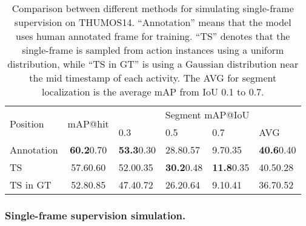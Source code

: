 \documentclass[runningheads]{llncs}
\begin{document}
	\begin{table}[!t]
		\centering
		\small
		\caption{Comparison between different methods for simulating single-frame supervision on THUMOS14. ``Annotation'' means that the model uses human annotated frame for training. 
			``TS'' denotes that the single-frame is sampled from action instances using a uniform distribution, while ``TS in GT'' is using a Gaussian distribution near the mid timestamp of each activity. The AVG for segment localization is the average mAP from IoU 0.1 to 0.7. 
		}
		
		\setlength\extrarowheight{1pt}
\begin{tabular}{l|c|p{1.7cm}p{1.7cm}p{1.7cm}p{1.7cm}}
			\hline
			\multirow{2}{*}{Position} &  \multirow{2}{*}{mAP@hit} & \multicolumn{4}{c}{Segment mAP@IoU }          \\ \cline{3-6}
			\multicolumn{1}{c|}{}  & &  0.3  & 0.5  & 0.7  & AVG    \\ \hline
			Annotation  & \textbf{60.2}0.70  & \textbf{53.3}0.30 & 28.80.57 & 9.70.35 & \textbf{40.6}0.40\\
			TS & 57.60.60 & 52.00.35 & \textbf{30.2}0.48 & \textbf{11.8}0.35 & 40.50.28 \\
			TS in GT & 52.80.85	& 47.40.72	& 26.20.64	& 9.10.41 &	36.70.52  \\ \hline
		\end{tabular}
\label{tab:th14_FP}
	\end{table}
	
	\subsubsection{Single-frame supervision simulation.}
	
\end{document}
